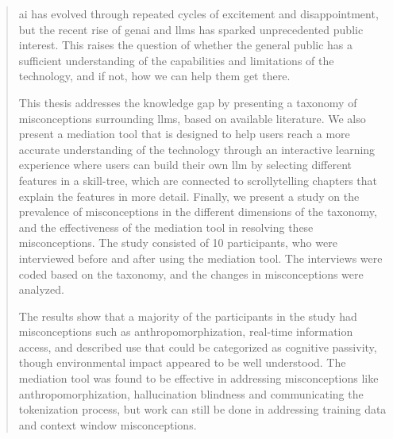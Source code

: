 
\begin{abstract} 

\noindent \gls{ai} has evolved through repeated cycles of excitement and disappointment, but the recent rise of \gls{genai} and \gls{llms} has sparked unprecedented public interest.
This raises the question of whether the general public has a sufficient understanding of the capabilities and limitations of the technology, and if not, how we can help them get there. 

This thesis addresses the knowledge gap by presenting a taxonomy of misconceptions surrounding \gls{llms}, based on available literature. 
We also present a mediation tool that is designed to help users reach a more accurate understanding of the technology through an interactive learning experience where users can build their own \gls{llm} by selecting different features in a skill-tree, which are connected to scrollytelling chapters that explain the features in more detail. 
Finally, we present a study on the prevalence of misconceptions in the different dimensions of the taxonomy, and the effectiveness of the mediation tool in resolving these misconceptions.
The study consisted of 10 participants, who were interviewed before and after using the mediation tool. The interviews were coded based on the taxonomy, and the changes in misconceptions were analyzed.

The results show that a majority of the participants in the study had misconceptions such as anthropomorphization, real-time information access, and described use that could be categorized as cognitive passivity, though environmental impact appeared to be well understood.
The mediation tool was found to be effective in addressing misconceptions like anthropomorphization, hallucination blindness and communicating the tokenization process, but work can still be done in addressing training data and context window misconceptions.

\end{abstract}

